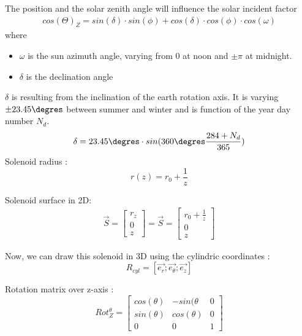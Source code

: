 \documentclass[12pt,a4paper]{article}
\begin{document}
The position and the solar zenith angle will influence the solar incident factor 
\begin{eqnarray}
cos(\Theta)_{Z} = sin(\delta) \cdot sin(\phi) + cos(\delta) \cdot cos(\phi) \cdot cos(\omega)
\end{eqnarray}
where
\begin{itemize}
	\item $\omega$ is the sun azimuth angle, varying from 0 at noon and $\pm \pi$ at midnight. 
	\item $\delta$ is the declination angle
\end{itemize}
$\delta$ is resulting from the inclination of the earth rotation axis. It is varying $\pm 23.45 \degres$ between summer and winter and is function of the year day number $N_d$.
\begin{eqnarray}
\delta = 23.45 \degres \cdot sin(360 \degres \frac{284+N_d}{365})
\end{eqnarray}
\newpage
Solenoid radius : 
\begin{equation}
r(z)=r_0 + \frac{1}{z}
\end{equation}
\begin{center}
\end{center}
Solenoid surface in 2D: 
\begin{eqnarray}
\vec{S}=\begin{bmatrix}
r_z \\
0\\
z
\end{bmatrix} = 
\vec{S}=\begin{bmatrix}
r_0 + \frac{1}{z} \\
0\\
z
\end{bmatrix}
\end{eqnarray}


Now, we can draw this solenoid in 3D using the cylindric coordinates : 
\begin{equation}
R_{cyl}=[\vec{e_r};\vec{e_{\theta}};\vec{e_z}]
\end{equation}

Rotation matrix over z-axis : 
\begin{equation}
Rot_Z^{\theta}=
\begin{bmatrix}
cos(\theta) & -sin(\theta & 0\\
sin(\theta) & cos(\theta) & 0\\
0 & 0 & 1
\end{bmatrix}
\end{equation}
\end{document}
